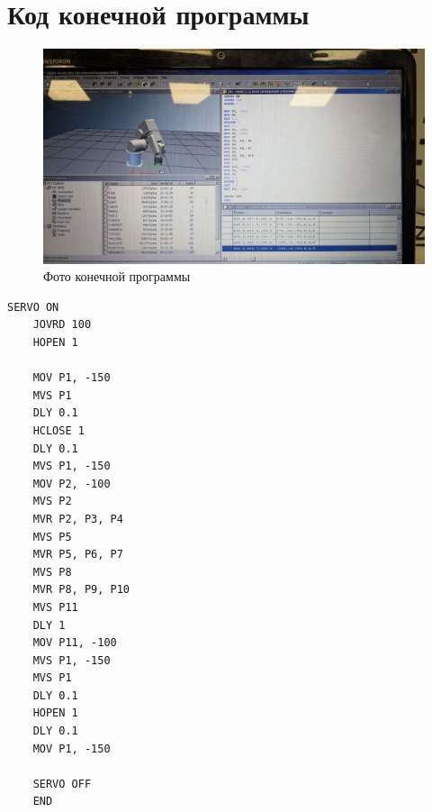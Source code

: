\documentclass[a4paper, 12pt]{article}
\begin{document}
    \section{Код конечной программы}
    \begin{figure}[H]
        \centering
        \includegraphics[scale=0.36]{code.jpg}
        \captionsetup{skip=0pt}
        \caption{Фото конечной программы}
        \label{fig:codephoto}
    \end{figure}
    \begin{lstlisting}[label=code, caption={Листинг конечной программы}]
    SERVO ON
    JOVRD 100
    HOPEN 1

    MOV P1, -150
    MVS P1
    DLY 0.1
    HCLOSE 1
    DLY 0.1
    MVS P1, -150
    MOV P2, -100
    MVS P2
    MVR P2, P3, P4
    MVS P5
    MVR P5, P6, P7
    MVS P8
    MVR P8, P9, P10
    MVS P11
    DLY 1
    MOV P11, -100
    MVS P1, -150
    MVS P1
    DLY 0.1
    HOPEN 1
    DLY 0.1
    MOV P1, -150

    SERVO OFF
    END
    \end{lstlisting}
\end{document}
